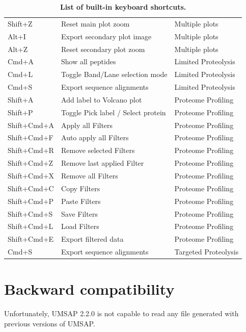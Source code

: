 \begin{table}[h!]
\begin{tabular}{l l l}
        Shift+Z    &Reset main plot zoom               &Multiple plots\\
        Alt+I      &Export secondary plot image        &Multiple plots\\
        Alt+Z      &Reset secondary plot zoom          &Multiple plots\\
        Cmd+A      &Show all peptides                  &Limited Proteolysis\\
        Cmd+L      &Toggle Band/Lane selection mode    &Limited Proteolysis\\
        Cmd+S      &Export sequence alignments         &Limited Proteolysis\\
        Shift+A    &Add label to Volcano plot          &Proteome Profiling\\
        Shift+P    &Toggle Pick label / Select protein &Proteome Profiling\\
        Shift+Cmd+A&Apply all Filters                  &Proteome Profiling\\
        Shift+Cmd+F&Auto apply all Filters             &Proteome Profiling\\
        Shift+Cmd+R&Remove selected Filters            &Proteome Profiling\\
        Shift+Cmd+Z&Remove last applied Filter         &Proteome Profiling\\
        Shift+Cmd+X&Remove all Filters                 &Proteome Profiling\\
        Shift+Cmd+C&Copy Filters                       &Proteome Profiling\\
        Shift+Cmd+P&Paste Filters                      &Proteome Profiling\\
        Shift+Cmd+S&Save Filters                       &Proteome Profiling\\
        Shift+Cmd+L&Load Filters                       &Proteome Profiling\\
        Shift+Cmd+E&Export filtered data               &Proteome Profiling\\
        Cmd+S      &Export sequence alignments         &Targeted Proteolysis\\
        \hline		
    \end{tabular}
    \caption[List of built-in keyboard shortcuts]{\textbf{List of built-in keyboard shortcuts.}}
    \label{table:shortcuts}
\end{table}

\section{Backward compatibility}
\label{sec:backwardCompatibility}

Unfortunately, UMSAP 2.2.0 is not capable to read any file generated with previous
versions of UMSAP.